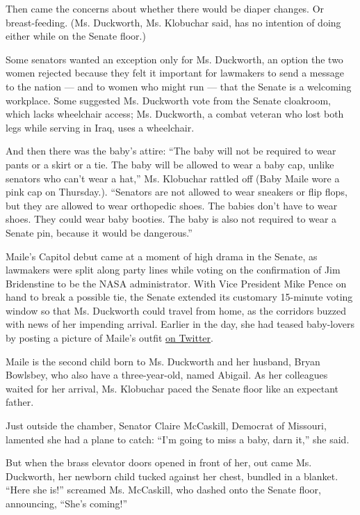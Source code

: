 Then came the concerns about whether there would be diaper changes. Or
breast-feeding. (Ms. Duckworth, Ms. Klobuchar said, has no intention of
doing either while on the Senate floor.)

Some senators wanted an exception only for Ms. Duckworth, an option the
two women rejected because they felt it important for lawmakers to send
a message to the nation --- and to women who might run --- that the
Senate is a welcoming workplace. Some suggested Ms. Duckworth vote from
the Senate cloakroom, which lacks wheelchair access; Ms. Duckworth, a
combat veteran who lost both legs while serving in Iraq, uses a
wheelchair.

And then there was the baby's attire: ``The baby will not be required to
wear pants or a skirt or a tie. The baby will be allowed to wear a baby
cap, unlike senators who can't wear a hat,'' Ms. Klobuchar rattled off
(Baby Maile wore a pink cap on Thursday.). ``Senators are not allowed to
wear sneakers or flip flops, but they are allowed to wear orthopedic
shoes. The babies don't have to wear shoes. They could wear baby
booties. The baby is also not required to wear a Senate pin, because it
would be dangerous.''

Maile's Capitol debut came at a moment of high drama in the Senate, as
lawmakers were split along party lines while voting on the confirmation
of Jim Bridenstine to be the NASA administrator. With Vice President
Mike Pence on hand to break a possible tie, the Senate extended its
customary 15-minute voting window so that Ms. Duckworth could travel
from home, as the corridors buzzed with news of her impending arrival.
Earlier in the day, she had teased baby-lovers by posting a picture of
Maile's outfit
\href{https://twitter.com/tammyduckworth/status/986990557166821376}{on
Twitter}.

Maile is the second child born to Ms. Duckworth and her husband, Bryan
Bowlsbey, who also have a three-year-old, named Abigail. As her
colleagues waited for her arrival, Ms. Klobuchar paced the Senate floor
like an expectant father.

Just outside the chamber, Senator Claire McCaskill, Democrat of
Missouri, lamented she had a plane to catch: ``I'm going to miss a baby,
darn it,'' she said.

But when the brass elevator doors opened in front of her, out came Ms.
Duckworth, her newborn child tucked against her chest, bundled in a
blanket. ``Here she is!'' screamed Ms. McCaskill, who dashed onto the
Senate floor, announcing, ``She's coming!''

